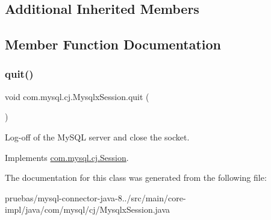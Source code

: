 \subsection*{Additional Inherited Members}


\subsection{Member Function Documentation}
\mbox{\label{classcom_1_1mysql_1_1cj_1_1_mysqlx_session_a20bd0339551fe3c5bb9b5806e2036ed3}} 
\subsubsection{\texorpdfstring{quit()}{quit()}}
{\footnotesize\ttfamily void com.\+mysql.\+cj.\+Mysqlx\+Session.\+quit (\begin{DoxyParamCaption}{ }\end{DoxyParamCaption})}

Log-\/off of the My\+S\+QL server and close the socket. 

Implements \mbox{\hyperlink{interfacecom_1_1mysql_1_1cj_1_1_session_af29d73c4e1343fb4bee53b0bac720108}{com.\+mysql.\+cj.\+Session}}.



The documentation for this class was generated from the following file\+:\begin{DoxyCompactItemize}
\item 
pruebas/mysql-\/connector-\/java-\/8../src/main/core-\/impl/java/com/mysql/cj/Mysqlx\+Session.\+java\end{DoxyCompactItemize}
